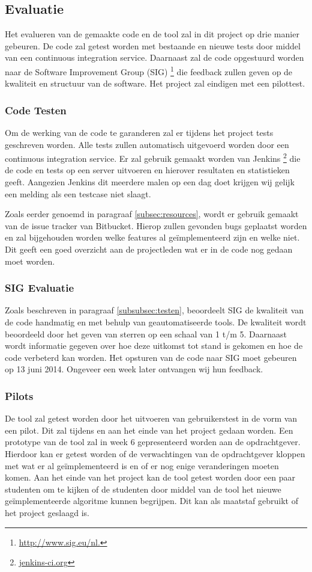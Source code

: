 \subsection{Evaluatie}
Het evalueren van de gemaakte code en de tool zal in dit project op drie manier gebeuren. De code zal getest worden met bestaande en nieuwe tests door middel van een continuous integration service. Daarnaast zal de code opgestuurd worden naar de Software Improvement Group (SIG) \footnote{\url{http://www.sig.eu/nl.}} die feedback zullen geven op de kwaliteit en structuur van de software. Het project zal eindigen met een pilottest.

\subsubsection{Code Testen}
Om de werking van de code te garanderen zal er tijdens het project tests geschreven worden. Alle tests zullen automatisch uitgevoerd worden door een continuous integration service. Er zal gebruik gemaakt worden van Jenkins \footnote{\url{jenkins-ci.org}} die de code en tests op een server uitvoeren en hierover resultaten en statistieken geeft. Aangezien Jenkins dit meerdere malen op een dag doet krijgen wij gelijk een melding als een testcase niet slaagt.

Zoals eerder genoemd in paragraaf \ref{subsec:resources}, wordt er gebruik gemaakt van de issue tracker van Bitbucket. Hierop zullen gevonden bugs geplaatst worden en zal bijgehouden worden welke features al ge\"implementeerd zijn en welke niet. Dit geeft een goed overzicht aan de projectleden wat er in de code nog gedaan moet worden.

\subsubsection{SIG Evaluatie}
Zoals beschreven in paragraaf \ref{subsubsec:testen}, beoordeelt SIG de kwaliteit van de code handmatig en met behulp van geautomatiseerde tools. De kwaliteit wordt beoordeeld door het geven van sterren op een schaal van 1 t/m 5. Daarnaast wordt informatie gegeven over hoe deze uitkomst tot stand is gekomen en hoe de code verbeterd kan worden. Het opsturen van de code naar SIG moet gebeuren op 13 juni 2014. Ongeveer een week later ontvangen wij hun feedback.

\subsubsection{Pilots}
De tool zal getest worden door het uitvoeren van gebruikerstest in de vorm van een pilot. Dit zal tijdens en aan het einde van het project gedaan worden. Een prototype van de tool zal in week 6 gepresenteerd worden aan de opdrachtgever. Hierdoor kan er getest worden of de verwachtingen van de opdrachtgever kloppen met wat er al ge\"implementeerd is en of er nog enige veranderingen moeten komen. Aan het einde van het project kan de tool getest worden door een paar studenten om te kijken of de studenten door middel van de tool het nieuwe ge\"implementeerde algoritme kunnen begrijpen. Dit kan als maatstaf gebruikt of het project geslaagd is.
